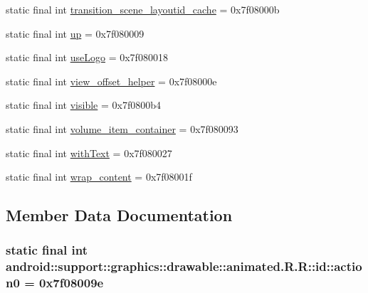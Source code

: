 \begin{CompactItemize}
\item 
static final int \hyperlink{classandroid_1_1support_1_1graphics_1_1drawable_1_1animated_1_1_r_1_1id_9c8bf03a313642cf56019be42ea9c3f3}{transition\_\-scene\_\-layoutid\_\-cache} = 0x7f08000b
\item 
static final int \hyperlink{classandroid_1_1support_1_1graphics_1_1drawable_1_1animated_1_1_r_1_1id_8f01e0f8dedf256216bf36672b4acf97}{up} = 0x7f080009
\item 
static final int \hyperlink{classandroid_1_1support_1_1graphics_1_1drawable_1_1animated_1_1_r_1_1id_2d28196dc171ff6be5109e0e97e470df}{useLogo} = 0x7f080018
\item 
static final int \hyperlink{classandroid_1_1support_1_1graphics_1_1drawable_1_1animated_1_1_r_1_1id_f641a40c289206d49ddf44e594d8c82e}{view\_\-offset\_\-helper} = 0x7f08000e
\item 
static final int \hyperlink{classandroid_1_1support_1_1graphics_1_1drawable_1_1animated_1_1_r_1_1id_f725c5f23c35fc928cf53297604e0c05}{visible} = 0x7f0800b4
\item 
static final int \hyperlink{classandroid_1_1support_1_1graphics_1_1drawable_1_1animated_1_1_r_1_1id_3400045b43fdcfb1e21107a488b754a2}{volume\_\-item\_\-container} = 0x7f080093
\item 
static final int \hyperlink{classandroid_1_1support_1_1graphics_1_1drawable_1_1animated_1_1_r_1_1id_0d428278490e3a3c5fd24174fab45134}{withText} = 0x7f080027
\item 
static final int \hyperlink{classandroid_1_1support_1_1graphics_1_1drawable_1_1animated_1_1_r_1_1id_96152fd5d70c56e4fad361e5fbbe1e33}{wrap\_\-content} = 0x7f08001f
\end{CompactItemize}


\subsection{Member Data Documentation}
\hypertarget{classandroid_1_1support_1_1graphics_1_1drawable_1_1animated_1_1_r_1_1id_3656608a216ec8aa2c2b183483fbe692}{
\subsubsection[{action0}]{\setlength{\rightskip}{0pt plus 5cm}static final int android::support::graphics::drawable::animated.R.R::id::action0 = 0x7f08009e}}
\label{classandroid_1_1support_1_1graphics_1_1drawable_1_1animated_1_1_r_1_1id_3656608a216ec8aa2c2b183483fbe692}


